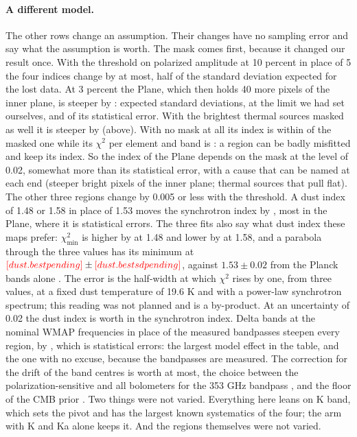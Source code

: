 \paragraph{A different model.} The other rows change an assumption. Their changes have no sampling
error and say what the assumption is worth. The mask comes first, because it changed our result
once. With the threshold on polarized amplitude at 10 percent in place of 5 the four indices change by
 at most, half of the standard deviation expected for the lost data. At 3
percent the Plane, which then holds 40 more pixels of the inner plane, is steeper by
:  expected standard deviations, at the limit we
had set ourselves, and  of its statistical error. With the brightest
thermal sources masked as well it is steeper by  (above). With no mask at all
its index is within  of the masked one while its $\chi^2$ per element and band
is : a region can be badly misfitted and keep its index. So the index of the Plane
depends on the mask at the level of 0.02, somewhat more than its statistical error, with a cause that
can be named at each end (steeper bright pixels of the inner plane; thermal sources that pull flat).
The other three regions change by 0.005 or less with the threshold. A dust index of
1.48 or 1.58 in place of 1.53 moves the synchrotron index by , most in the Plane,
where it is  statistical errors. The three fits also say what dust index these
maps prefer: $\chi^2_{\min}$ is higher by  at 1.48 and lower by 
at 1.58, and a parabola through the three values has its minimum at
$\N{dust.best} \pm \N{dust.bestsd}$, against $1.53 \pm 0.02$ from the Planck bands alone
\citep{planck2018xi}. The error is the half-width at which $\chi^2$ rises by one, from three values,
at a fixed dust temperature of 19.6 K and with a power-law synchrotron spectrum; this reading was
not planned and is a by-product. At an uncertainty of 0.02 the dust index is worth
 in the synchrotron index. Delta bands at the nominal WMAP frequencies in place
of the measured bandpasses steepen every region, by , which is
 statistical errors: the largest model effect in the table, and the one with
no excuse, because the bandpasses are measured. The correction for the drift of the band centres is
worth  at most, the choice between the polarization-sensitive and all
bolometers for the 353 GHz bandpass , and the floor of the CMB prior
. Two things were not varied. Everything here leans on K band, which sets the
pivot and has the largest known systematics of the four; the arm with K and Ka alone keeps it. And
the regions themselves were not varied.

